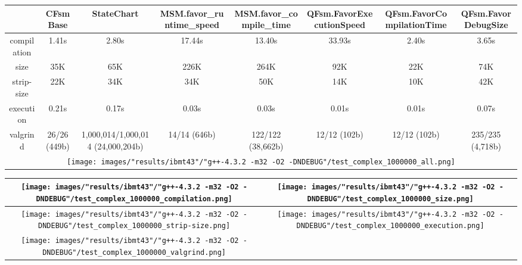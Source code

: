 \begin{landscape}
\begin{table}
\caption{"ibmt43" [df6407d], g++-4.3.2 -m32 -O2 -DNDEBUG/test complex 1000000}
\centering
\begin{longtable}{| c | c |c |c |c |c |c |c |}
\hline
& CFsmBase& StateChart& MSM.favor\_runtime\_speed& MSM.favor\_compile\_time& QFsm.FavorExecutionSpeed& QFsm.FavorCompilationTime& QFsm.FavorDebugSize\\
\hline
compilation & 1.41s & 2.80s & 17.44s & 13.40s & 33.93s & 2.40s & 3.65s\\
\hline
size & 35K & 65K & 226K & 264K & 92K & 22K & 74K\\
\hline
strip-size & 22K & 34K & 34K & 50K & 14K & 10K & 42K\\
\hline
execution & 0.21s & 0.17s & 0.03s & 0.03s & 0.01s & 0.01s & 0.07s\\
\hline
valgrind & 26/26 (449b) & 1,000,014/1,000,014 (24,000,204b) & 14/14 (646b) & 122/122 (38,662b) & 12/12 (102b) & 12/12 (102b) & 235/235 (4,718b)\\
\hline
\multicolumn{8}{|c|}{\texttt{[image: images/"results/ibmt43"/"g++-4.3.2 -m32 -O2 -DNDEBUG"/test\_complex\_1000000\_all.png]}}\\
\hline
\end{longtable}
\end{table}
\end{landscape}
\newpage
\begin{table}
\centering
\begin{longtable}{| c | c |}
\hline
\texttt{[image: images/"results/ibmt43"/"g++-4.3.2 -m32 -O2 -DNDEBUG"/test\_complex\_1000000\_compilation.png]}& \texttt{[image: images/"results/ibmt43"/"g++-4.3.2 -m32 -O2 -DNDEBUG"/test\_complex\_1000000\_size.png]}\\
\hline
\texttt{[image: images/"results/ibmt43"/"g++-4.3.2 -m32 -O2 -DNDEBUG"/test\_complex\_1000000\_strip-size.png]}& \texttt{[image: images/"results/ibmt43"/"g++-4.3.2 -m32 -O2 -DNDEBUG"/test\_complex\_1000000\_execution.png]}\\
\hline
\texttt{[image: images/"results/ibmt43"/"g++-4.3.2 -m32 -O2 -DNDEBUG"/test\_complex\_1000000\_valgrind.png]}& \\ \hline
\end{longtable}
\end{table}
